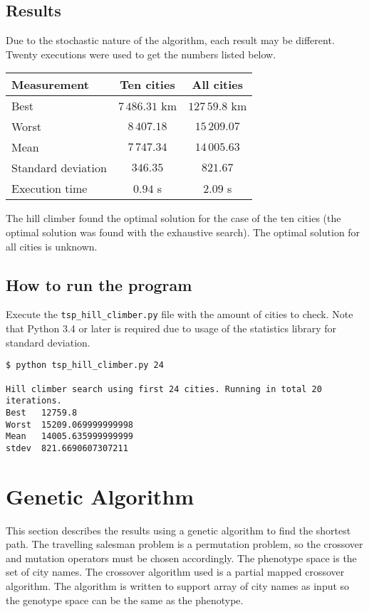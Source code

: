 \documentclass{article}
\begin{document}
\subsection*{Results}

Due to the stochastic nature of the algorithm, each result may be different. Twenty executions were used to get the numbers listed below.

\begin{center}
\begin{tabular}{lcc}
\toprule
Measurement & Ten cities & All cities \\
\midrule
Best & $7\,486.31$ km & $127\,59.8$ km \\
Worst & $8\,407.18$ & $15\,209.07$ \\
Mean & $7\,747.34$ & $14\,005.63$ \\
Standard deviation & $346.35$ & $821.67$ \\
Execution time & $0.94$ s & $2.09$ s \\
\bottomrule
\end{tabular}
\end{center}

The hill climber found the optimal solution for the case of the ten cities (the optimal solution was found with the exhaustive search). The optimal solution for all cities is unknown.

\subsection*{How to run the program}

Execute the \texttt{tsp\_hill\_climber.py} file with the amount of cities to check. Note that Python 3.4 or later is required due to usage of the statistics library for standard deviation.

\begin{verbatim}
$ python tsp_hill_climber.py 24

Hill climber search using first 24 cities. Running in total 20
iterations.
Best   12759.8
Worst  15209.069999999998
Mean   14005.635999999999
stdev  821.6690607307211
\end{verbatim}

\section*{Genetic Algorithm}

This section describes the results using a genetic algorithm to find the shortest path. The travelling salesman problem is a permutation problem, so the crossover and mutation operators must be chosen accordingly. The phenotype space is the set of city names. The crossover algorithm used is a partial mapped crossover algorithm. The algorithm is written to support array of city names as input so the genotype space can be the same as the phenotype.
\end{document}
